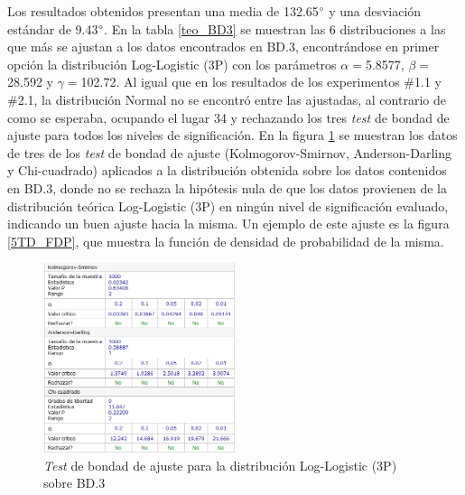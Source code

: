 \documentclass[12pt]{report}
\begin{document}
Los resultados obtenidos presentan una media de 132.65$\degree$ y una desviación estándar de 9.43$\degree$. En la tabla \ref{teo_BD3}  se muestran las 6 distribuciones a las que más se ajustan a los datos encontrados en BD.3, encontrándose en primer opción la distribución Log-Logistic (3P) con los parámetros $\alpha=$5.8577, $\beta=$28.592 y $\gamma=$102.72. Al igual que en los resultados de los experimentos \#1.1 y \#2.1, la distribución Normal no se encontró entre las ajustadas, al contrario de como se esperaba, ocupando el lugar 34 y rechazando los tres \textit{test} de bondad de ajuste para todos los niveles de significación. En la figura \ref{5TD_BONDAD} se  muestran los datos de tres de los \textit{test} de bondad de ajuste (Kolmogorov-Smirnov, Anderson-Darling y Chi-cuadrado) aplicados a la distribución obtenida sobre los datos contenidos en BD.3, donde no se rechaza la hipótesis nula de que los datos provienen de la distribución teórica Log-Logistic (3P) en ningún nivel de significación evaluado, indicando un buen ajuste hacia la misma. Un ejemplo de este ajuste es la figura \ref{5TD_FDP}, que muestra la función de densidad de probabilidad de la misma. 
\begin{figure}[ht]
	\centering
	
	\includegraphics[width=0.5\textwidth]{5td_bondad.png}
	\caption{\textit{Test} de bondad de ajuste para la distribución Log-Logistic (3P) sobre BD.3}
	\label{5TD_BONDAD}
\end{figure}
         
\end{document}
